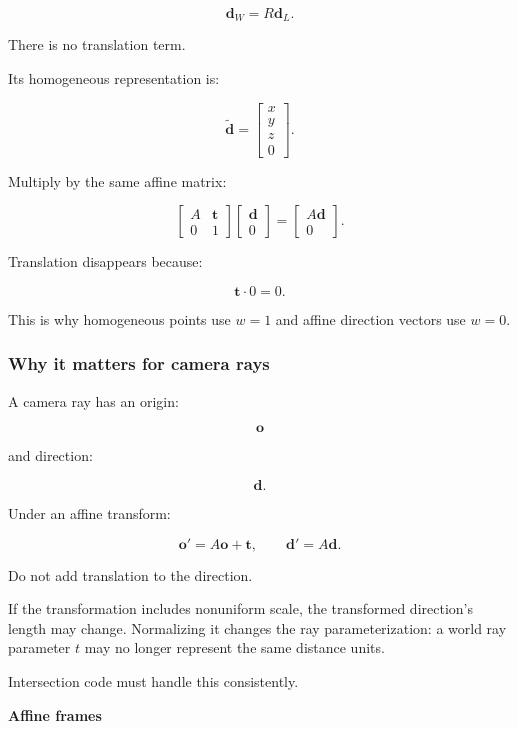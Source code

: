 \[
 \boxed{ \mathbf d_W=R\mathbf d_L }.
\]

There is no translation term.

Its homogeneous representation is:

\[
 \boxed{ \tilde{\mathbf d}= \begin{bmatrix}x\\y\\z\\0\end{bmatrix} }.
\]

Multiply by the same affine matrix:

\[
 \begin{bmatrix} A&\mathbf t\\ 0&1 \end{bmatrix} \begin{bmatrix} \mathbf d\\0 \end{bmatrix} = \begin{bmatrix} A\mathbf d\\0 \end{bmatrix}.
\]

Translation disappears because:

\[
 \mathbf t\cdot0=0.
\]

This is why homogeneous points use \(w=1\) and affine direction vectors use \(w=0\).

\subsubsection{Why it matters for camera rays}\label{why-it-matters-for-camera-rays}

A camera ray has an origin:

\[
 \mathbf o
\]

and direction:

\[
 \mathbf d.
\]

Under an affine transform:

\[
 \boxed{ \mathbf o'=A\mathbf o+\mathbf t, \qquad \mathbf d'=A\mathbf d }.
\]

Do not add translation to the direction.

If the transformation includes nonuniform scale, the transformed direction's length may change. Normalizing it changes the ray parameterization: a world ray parameter \(t\) may no longer represent the same distance units.

Intersection code must handle this consistently.

\textbf{Affine frames}


